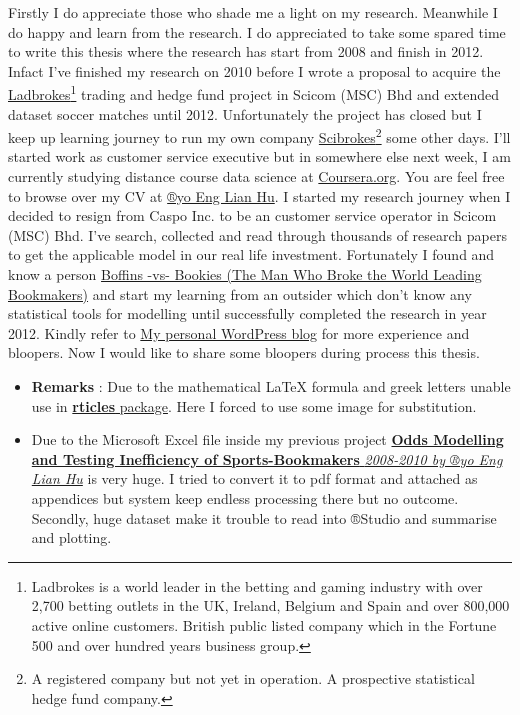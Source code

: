 \documentclass[article]{jss}
\providecommand{\tightlist}{%
  \setlength{\itemsep}{0pt}\setlength{\parskip}{0pt}}
\begin{document}
Firstly I do appreciate those who shade me a light on my research.
Meanwhile I do happy and learn from the research. I do appreciated to
take some spared time to write this thesis where the research has start
from 2008 and finish in 2012. Infact I've finished my research on 2010
before I wrote a proposal to acquire the
\href{http://www.ladbrokesplc.com/}{Ladbrokes}\footnote{Ladbrokes is a
  world leader in the betting and gaming industry with over 2,700
  betting outlets in the UK, Ireland, Belgium and Spain and over 800,000
  active online customers. British public listed company which in the
  Fortune 500 and over hundred years business group.} trading and hedge
fund project in Scicom (MSC) Bhd and extended dataset soccer matches
until 2012. Unfortunately the project has closed but I keep up learning
journey to run my own company
\href{https://github.com/scibrokes/owner}{Scibrokes}\footnote{A
  registered company but not yet in operation. A prospective statistical
  hedge fund company.} some other days. I'll started work as customer
service executive but in somewhere else next week, I am currently
studying distance course data science at
\href{http://www.coursera.org}{Coursera.org}. You are feel free to
browse over my CV at
\href{https://beta.rstudioconnect.com/englianhu/ryo-eng/}{®yo Eng Lian
Hu}. \bigbreak
  I started my research journey when I decided to resign from Caspo Inc.
to be an customer service operator in Scicom (MSC) Bhd. I've search,
collected and read through thousands of research papers to get the
applicable model in our real life investment. Fortunately I found and
know a person
\href{https://englianhu.wordpress.com/sportsbook/boffins-vs-bookies-the-man-who-broke-the-world-leading-bookmakers/}{Boffins
-vs- Bookies (The Man Who Broke the World Leading Bookmakers)} and start
my learning from an outsider which don't know any statistical tools for
modelling until successfully completed the research in year 2012. Kindly
refer to \href{https://englianhu.wordpress.com/}{My personal WordPress
blog} for more experience and bloopers. \bigbreak
  Now I would like to share some bloopers during process this thesis.

\begin{itemize}
\tightlist
\item
  \textbf{Remarks} : Due to the mathematical LaTeX formula and greek
  letters unable use in
  \href{https://github.com/rstudio/rticles}{\textbf{rticles} package}.
  Here I forced to use some image for substitution.
\item
  Due to the Microsoft Excel file inside my previous project
  \href{https://www.dropbox.com/home/Research\%20Project\%202}{\textbf{Odds
  Modelling and Testing Inefficiency of Sports-Bookmakers}
  \emph{2008-2010 by ®yo Eng Lian Hu}} is very huge. I tried to convert
  it to pdf format and attached as appendices but system keep endless
  processing there but no outcome. Secondly, huge dataset make it
  trouble to read into ®Studio and summarise and plotting.
\end{itemize}
\end{document}
